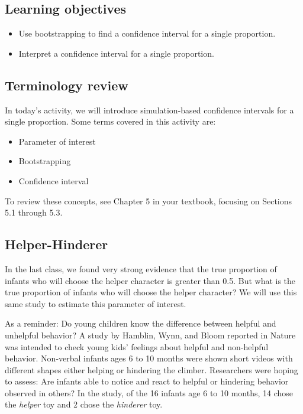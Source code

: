 \documentclass[
]{report}
\begin{document}

\hypertarget{learning-objectives-7}{%
\subsection{Learning objectives}\label{learning-objectives-7}}

\begin{itemize}
\item
  Use bootstrapping to find a confidence interval for a single proportion.
\item
  Interpret a confidence interval for a single proportion.
\end{itemize}

\hypertarget{terminology-review-12}{%
\subsection{Terminology review}\label{terminology-review-12}}

In today's activity, we will introduce simulation-based confidence intervals for a single proportion. Some terms covered in this activity are:

\begin{itemize}
\item
  Parameter of interest
\item
  Bootstrapping
\item
  Confidence interval
\end{itemize}

To review these concepts, see Chapter 5 in your textbook, focusing on Sections 5.1 through 5.3.

\hypertarget{helper-hinderer-1}{%
\subsection{Helper-Hinderer}\label{helper-hinderer-1}}

In the last class, we found very strong evidence that the true proportion of infants who will choose the helper character is greater than 0.5. But what is the true proportion of infants who will choose the helper character? We will
use this same study to estimate this parameter of interest.

As a reminder: Do young children know the difference between helpful and unhelpful behavior? A study by Hamblin, Wynn, and Bloom reported in Nature was intended to check young kids' feelings about helpful and non-helpful behavior. Non-verbal infants ages 6 to 10 months were shown short videos with different shapes either helping or hindering the climber. Researchers were hoping to assess: Are infants able to notice and react to helpful or hindering behavior observed in others? In the study, of the 16 infants age 6 to 10 months, 14 chose the \emph{helper} toy and 2 chose the \emph{hinderer} toy.
\end{document}
